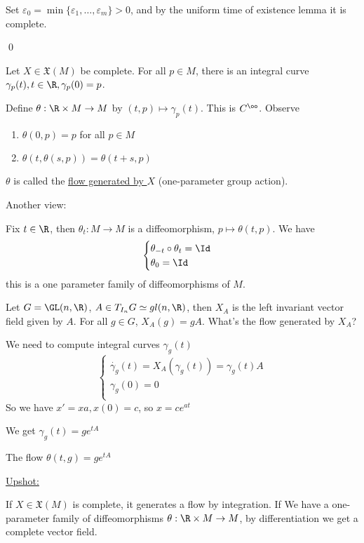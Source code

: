\documentclass[x11names,reqno,14pt]{extarticle}
\newcommand{\mk}[1]{\mathfrak{#1}}
\begin{document}
Set $\varepsilon_0 = \min\{\varepsilon_1,\dots,\varepsilon_m\}>0$, and by the uniform time of existence lemma it is complete. 

\qed

Let $X \in \mk{X}(M)$ be complete. For all $p \in M$, there is an integral curve $\gamma_p(t), t \in \R, \gamma_p(0) = p$. 

Define $\theta:\R \times M \to M$ by $(t, p) \mapsto \gamma_p(t)$. This is $C^\oo$. Observe
\begin{enumerate}

\item $\theta(0, p) = p$ for all $p \in M$ 

\item $\theta(t, \theta(s, p)) = \theta(t + s, p)$

\end{enumerate}


$\theta$ is called the \underline{flow generated by $X$} (one-parameter group action). 

Another view: 

Fix $t \in \R$, then $\theta_t:M\to M$ is a diffeomorphism, $p \mapsto \theta(t, p)$. We have
\[
\begin{cases}
\theta_{-t}\circ\theta_t = \Id \\
\theta_0 = \Id \\
\end{cases}
\]
this is a one parameter family of diffeomorphisms of $M$. 

\exm

Let $G = \GL(n,\R)$, $A \in T_{I_n}G \simeq gl(n, \R)$, then $X_A$ is the left invariant vector field given by $A$. For all $g \in G$, $X_A(g) = gA$. What's the flow generated by $X_A$?

We need to compute integral curves $\gamma_g(t)$ 
\[
\begin{cases}
\dot{\gamma_g}(t) = X_A(\gamma_g(t)) = \gamma_g(t)A\\
\gamma_g(0) = 0 \\
\end{cases}
\]
So we have $x' = xa, x(0) = c$, so $x = ce^{at}$

We get $\gamma_g(t) = ge^{tA}$

The flow $\theta(t, g) = ge^{tA}$

\underline{Upshot:}

If $X \in \mk{X}(M)$ is complete, it generates a flow by integration. If We have a one-parameter family of diffeomorphisms $\theta:\R\times M \to M$, by differentiation we get a complete vector field. 
\end{document}
